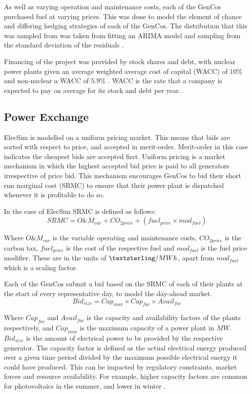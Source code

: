 \documentclass[final,3p,times,twocolumn,numbers]{elsarticle}
\begin{document}
As well as varying operation and maintenance costs, each of the GenCos purchased fuel at varying prices. This was done to model the element of chance and differing hedging strategies of each of the GenCos. The distribution that this was sampled from was taken from fitting an ARIMA model and sampling from the standard deviation of the residuals \cite{ARIMA}.

Financing of the project was provided by stock shares and debt, with nuclear power plants given an average weighted average cost of capital (WACC) of $10\%$ and non-nuclear a WACC of $5.9\%$ \cite{KPMG2017, Paper2012}. WACC is the rate that a company is expected to pay on average for its stock and debt per year.

\subsection{Power Exchange}
\label{sec:power_exchange}
ElecSim is modelled on a uniform pricing market. This means that bids are sorted with respect to price, and accepted in merit-order. Merit-order in this case indicates the cheapest bids are accepted first. Uniform pricing is a market mechanism in which the highest accepted bid price is paid to all generators irrespective of price bid. This mechanism encourages GenCos to bid their short run marginal cost (SRMC) to ensure that their power plant is dispatched whenever it is profitable to do so.

In the case of ElecSim SRMC is defined as follows:
\begin{equation}
\label{eq:srmc}
	SRMC = O\&M_{var}+CO_{2price}+\left(fuel_{price}\times mod_{fuel}\right)
\end{equation}

Where $O\&M_{var}$ is the variable operating and maintenance costs, $CO_{2price}$ is the carbon tax, $fuel_{price}$ is the cost of the respective fuel and $mod_{fuel}$ is the fuel price modifier. These are in the units of  $\textsterling\slash MWh$, apart from $mod_{fuel}$ which is a scaling factor. 

Each of the GenCos submit a bid based on the SRMC of each of their plants at the start of every representative day, to model the day-ahead market. 
\begin{equation}
	Bid_{size} = Cap_{max}\times Cap_{fac} \times Avail_{fac}
\end{equation}

Where $Cap_{fac}$ and $Avail_{fac}$ is the capacity and availability factors of the plants respectively, and $Cap_{max}$ is the maximum capacity of a power plant in $MW$. $Bid_{size}$ is the amount of electrical power to be provided by the respective generator. The capacity factor is defined as the actual electrical energy produced over a given time period divided by the maximum possible electrical energy it could have produced. This can be impacted by regulatory constraints, market forces and resource availability. For example, higher capacity factors are common for photovoltaics in the summer, and lower in winter \cite{Kell}.
\end{document}
